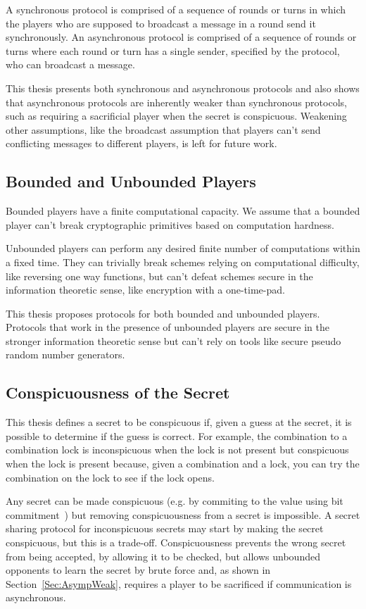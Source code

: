 \documentclass[12pt]{dalcsthesis}
\begin{document}
A synchronous protocol is comprised of a sequence of rounds or turns in which the players who are supposed to broadcast a message in a round send it synchronously. An asynchronous protocol is comprised of a sequence of rounds or turns where each round or turn has a single sender, specified by the protocol, who can broadcast a message.

This thesis presents both synchronous and asynchronous protocols and also shows that asynchronous protocols are inherently weaker than synchronous protocols, such as requiring a sacrificial player when the secret is conspicuous. Weakening other assumptions, like the broadcast assumption that players can't send conflicting messages to different players, is left for future work.

\subsection{Bounded and Unbounded Players}

Bounded players have a finite computational capacity. We assume that a bounded player can't break cryptographic primitives based on computation hardness.

Unbounded players can perform any desired finite number of computations within a fixed time. They can trivially break schemes relying on computational difficulty, like reversing one way functions, but can't defeat schemes secure in the information theoretic sense, like encryption with a one-time-pad.

This thesis proposes protocols for both bounded and unbounded players. Protocols that work in the presence of unbounded players are secure in the stronger information theoretic sense but can't rely on tools like secure pseudo random number generators.

\subsection{Conspicuousness of the Secret} 

This thesis defines a secret to be conspicuous if, given a guess at the secret, it is possible to determine if the guess is correct. For example, the combination to a combination lock is inconspicuous when the lock is not present but conspicuous when the lock is present because, given a combination and a lock, you can try the combination on the lock to see if the lock opens.

Any secret can be made conspicuous (e.g. by commiting to the value using bit commitment~\cite{Damg02, naor91}) but removing conspicuousness from a secret is impossible. A secret sharing protocol for inconspicuous secrets may start by making the secret conspicuous, but this is a trade-off. Conspicuousness prevents the wrong secret from being accepted, by allowing it to be checked, but allows unbounded opponents to learn the secret by brute force and, as shown in Section~\ref{Sec:AsympWeak}, requires a player to be sacrificed if communication is asynchronous.
\end{document}
